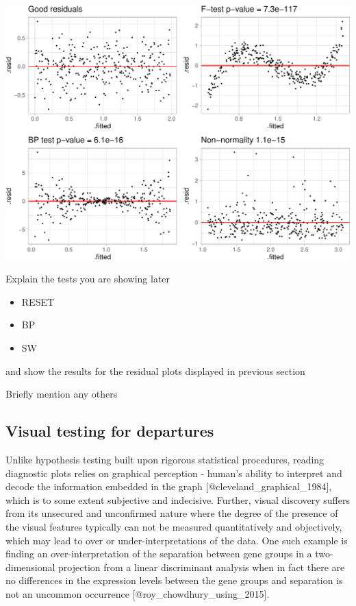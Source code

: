\documentclass[]{interact}
\theoremstyle{plain}%
\theoremstyle{definition}
\theoremstyle{remark}
\providecommand{\tightlist}{%
  \setlength{\itemsep}{0pt}\setlength{\parskip}{0pt}}
\def\tightlist{}
\begin{document}
\includegraphics[width=1\linewidth]{paper_comparison_files/figure-latex/unnamed-chunk-6-1}

Explain the tests you are showing later

\begin{itemize}
\tightlist
\item
  RESET
\item
  BP
\item
  SW
\end{itemize}

and show the results for the residual plots displayed in previous
section

Briefly mention any others

\hypertarget{visual-testing-for-departures}{%
\subsection{Visual testing for
departures}\label{visual-testing-for-departures}}

Unlike hypothesis testing built upon rigorous statistical procedures,
reading diagnostic plots relies on graphical perception - human's
ability to interpret and decode the information embedded in the graph
{[}@cleveland\_graphical\_1984{]}, which is to some extent subjective
and indecisive. Further, visual discovery suffers from its unsecured and
unconfirmed nature where the degree of the presence of the visual
features typically can not be measured quantitatively and objectively,
which may lead to over or under-interpretations of the data. One such
example is finding an over-interpretation of the separation between gene
groups in a two-dimensional projection from a linear discriminant
analysis when in fact there are no differences in the expression levels
between the gene groups and separation is not an uncommon occurrence
{[}@roy\_chowdhury\_using\_2015{]}.
\end{document}
